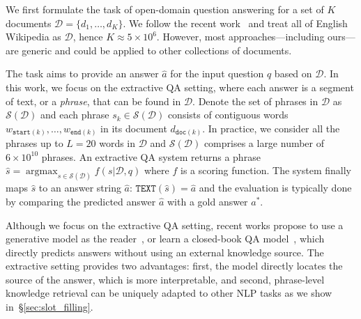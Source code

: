 \documentclass[11pt,a4paper]{article}
\newcommand{\documentset}{\mathcal{D}}
\newcommand{\phraseset}{\mathcal{S}(\mathcal{D})}
\newcommand\ti[1]{\textit{#1}}
\newcommand\ttt[1]{\texttt{#1}}
\DeclareMathOperator*{\argmax}{argmax}
\begin{document}
We first formulate the task of open-domain question answering for a set of $K$ documents $\documentset=\{d_1, \dots, d_K\}$.
We follow the recent work~\cite{chen2017reading,lee2019latent} and treat all of English Wikipedia as $\documentset$, hence $K \approx 5 \times 10^6$.
However, most approaches---including ours---are generic and could be applied to other collections of documents.

The task aims to provide an answer $\hat{a}$ for the input question $q$ based on $\documentset$.
In this work, we focus on the extractive QA setting, where each answer is a segment of text, or a \ti{phrase}, that can be found in $\documentset$.
Denote the set of phrases in $\documentset$ as $\phraseset$ and each phrase $s_{k} \in \phraseset$ consists of contiguous words $w_{\ttt{start}(k)}, \ldots, w_{\ttt{end}(k)}$ in its document $d_{\ttt{doc}(k)}$.
In practice, we consider all the phrases up to $L = 20$ words in $\documentset$ and $\phraseset$ comprises a large number of $6 \times 10^{10}$ phrases.
An extractive QA system returns a phrase $\hat{s} = \argmax_{s \in \mathcal{S}(\documentset)} f(s | \documentset, q)$ where $f$ is a scoring function. The system finally maps $\hat{s}$ to an answer string $\hat{a}$: $\ttt{TEXT}{(\hat{s})}=\hat{a}$ and the evaluation is typically done by comparing the predicted answer $\hat{a}$ with a gold answer $a^*$.

Although we focus on the extractive QA setting, recent works propose to use a generative model as the reader~\citep{lewis2020retrieval,izacard2020leveraging}, or learn a closed-book QA model~\citep{roberts2020much}, which directly predicts answers  without using an external knowledge source. The extractive setting provides two advantages: first, the model directly locates the source of the answer, which is more interpretable, and second, phrase-level knowledge retrieval can be uniquely adapted to other NLP tasks as we show in~\S\ref{sec:slot_filling}.
\end{document}
